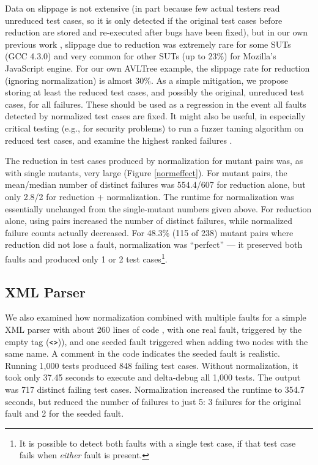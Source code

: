 Data on slippage is not extensive (in part because few actual testers
read unreduced test cases, so it is only detected if the original test
cases before reduction are stored and re-executed after bugs have been
fixed), but in our own previous work \cite{PLDI13}, slippage due to
reduction was extremely rare for some SUTs (GCC 4.3.0) and very common
for other SUTs (up to 23\%) for Mozilla's JavaScript engine.  For our
own AVLTree example, the slippage rate for reduction (ignoring
normalization) is almost 30\%.  As a simple mitigation, we propose
storing at least the reduced test cases, and possibly the original,
unreduced test cases, for all failures.  These should be used as a
regression in the event all faults detected by normalized test cases
are fixed.  It might also be useful, in especially critical testing
(e.g., for security problems) to run a fuzzer taming algorithm on
reduced test cases, and examine the highest ranked failures \cite{PLDI13}.

The reduction in test cases produced by normalization for mutant pairs
was, as with single mutants, very large (Figure \ref{normeffect}).
For mutant pairs, the mean/median number of distinct failures was
554.4/607 for reduction alone, but only 2.8/2 for reduction +
normalization.  The runtime for normalization was essentially
unchanged from the single-mutant numbers given above.  For reduction
alone, using pairs increased the number of distinct failures, while
normalized failure counts actually decreased.  For 48.3\% (115 of 238)
mutant pairs where reduction did not lose a fault, normalization was
``perfect'' --- it preserved both faults and produced only 1 or 2 test
cases\footnote{It is possible to detect both faults with a single test
  case, if that test case fails when \emph{either} fault is
  present.}. 

\subsection{XML Parser}

We also examined how normalization combined with multiple faults for a
simple XML parser with about 260 lines of code \cite{myxml}, with one
real fault, triggered by the empty tag ({\tt <>})), and one
seeded fault triggered when adding two nodes with the same
name.  A comment in the code indicates the seeded fault is realistic.  Running 1,000 tests
produced 848 failing test cases.  Without normalization, it took only
37.45 seconds to execute and delta-debug all 1,000 tests.  The output was 717 distinct failing test
cases.  Normalization increased the runtime to 354.7 seconds, but
reduced the number of failures to just 5: 3 failures
for the original fault and 2 for the seeded fault.



